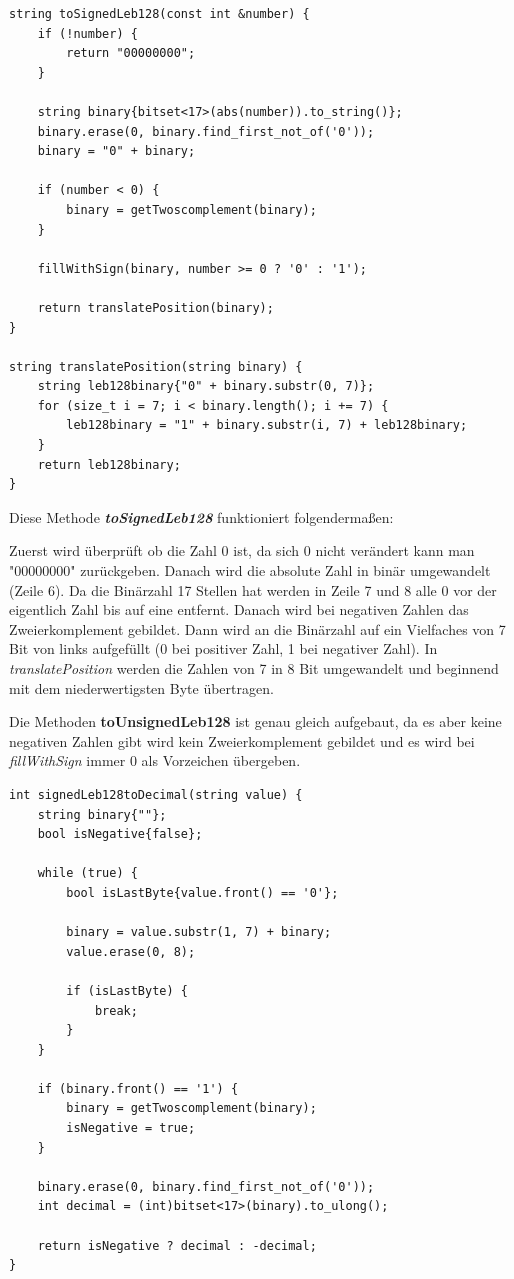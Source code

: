\documentclass{article}
\begin{document}
\begin{verbatim}
string toSignedLeb128(const int &number) {
    if (!number) {
        return "00000000";
    }

    string binary{bitset<17>(abs(number)).to_string()};
    binary.erase(0, binary.find_first_not_of('0'));
    binary = "0" + binary;
    
    if (number < 0) {
        binary = getTwoscomplement(binary);
    }

    fillWithSign(binary, number >= 0 ? '0' : '1');

    return translatePosition(binary);
}

string translatePosition(string binary) {
    string leb128binary{"0" + binary.substr(0, 7)};
    for (size_t i = 7; i < binary.length(); i += 7) {
        leb128binary = "1" + binary.substr(i, 7) + leb128binary;
    }
    return leb128binary;
}
\end{verbatim}

Diese Methode \textit{\textbf{toSignedLeb128}} funktioniert folgendermaßen:

Zuerst wird überprüft ob die Zahl 0 ist, da sich 0 nicht verändert kann man "00000000" zurückgeben.
Danach wird die absolute Zahl in binär umgewandelt (Zeile 6). Da die Binärzahl 17 Stellen hat werden in Zeile 7 und 8 alle 0 vor der eigentlich Zahl bis auf eine entfernt. Danach wird bei negativen Zahlen das Zweierkomplement gebildet. Dann wird an die Binärzahl auf ein Vielfaches von 7 Bit von links aufgefüllt (0 bei positiver Zahl, 1 bei negativer Zahl). In \textit{translatePosition} werden die Zahlen von 7 in 8 Bit umgewandelt und beginnend mit dem niederwertigsten Byte übertragen.

Die Methoden \textbf{toUnsignedLeb128} ist genau gleich aufgebaut, da es aber keine negativen Zahlen gibt wird kein Zweierkomplement gebildet und es wird bei \textit{fillWithSign} immer 0 als Vorzeichen übergeben.

\begin{verbatim}
int signedLeb128toDecimal(string value) {
    string binary{""};
    bool isNegative{false};
    
    while (true) {
        bool isLastByte{value.front() == '0'};

        binary = value.substr(1, 7) + binary;
        value.erase(0, 8);

        if (isLastByte) {
            break;
        }
    }

    if (binary.front() == '1') {
        binary = getTwoscomplement(binary);
        isNegative = true;
    }

    binary.erase(0, binary.find_first_not_of('0'));
    int decimal = (int)bitset<17>(binary).to_ulong();
    
    return isNegative ? decimal : -decimal;
}
\end{verbatim}
\end{document}
